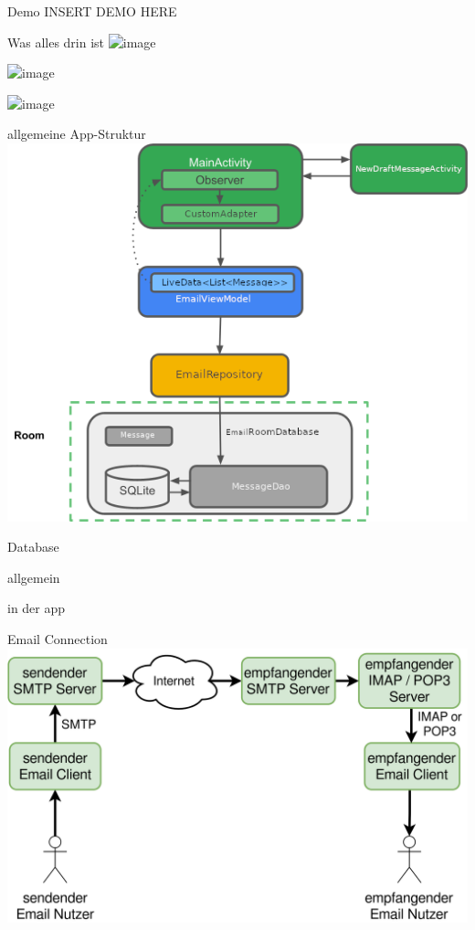 \documentclass[aspectratio=169]{beamer}
\begin{document}
\begin{frame}{Demo}
    INSERT DEMO HERE
\end{frame}

\begin{frame}{Was alles drin ist}
\includegraphics<1>[height=.8\textheight]{media/emailViewer.jpg}

\includegraphics<2>[height=.8\textheight]{media/emailWriter.jpg}

\includegraphics<3>[height=.8\textheight]{media/accountManager.jpg}
\end{frame}

\begin{frame}{allgemeine App-Struktur}
\centering
\includegraphics[height=.7\textheight]{../maturText/media/AppStructure.png}
\end{frame}

\begin{frame}{Database}
\begin{block}{allgemein}
\end{block}

\begin{block}{in der app}
\end{block}
\end{frame}

\begin{frame}{Email Connection}
\centering
\includegraphics[width=.8\textwidth]{../maturText/media/connection-diagram.png}
\end{frame}
\end{document}
